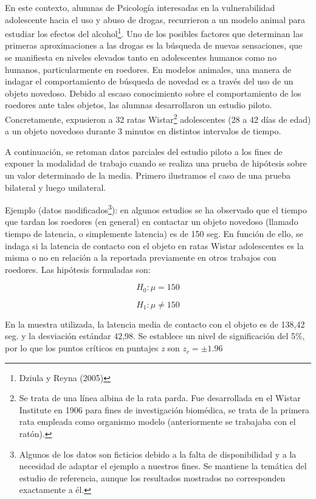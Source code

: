 \documentclass[]{book}
\let\rmarkdownfootnote\footnote%
\def\footnote{\protect\rmarkdownfootnote}
\begin{document}
En este contexto, alumnas de Psicología interesadas en la vulnerabilidad
adolescente hacia el uso y abuso de drogas, recurrieron a un modelo
animal para estudiar los efectos del alcohol\footnote{Dziula y Reyna (2005)}. Uno de los posibles
factores que determinan las primeras aproximaciones a las drogas es la
búsqueda de nuevas sensaciones, que se manifiesta en niveles elevados
tanto en adolescentes humanos como no humanos, particularmente en
roedores. En modelos animales, una manera de indagar el comportamiento
de búsqueda de novedad es a través del uso de un objeto novedoso. Debido
al escaso conocimiento sobre el comportamiento de los roedores ante
tales objetos, las alumnas desarrollaron un estudio piloto.
Concretamente, expusieron a 32 ratas Wistar\footnote{Se trata de una línea albina de la rata parda. Fue desarrollada en el Wistar Institute en 1906 para fines de investigación biomédica, se trata de la primera rata empleada como organismo modelo (anteriormente se trabajaba con el ratón).} adolescentes (28 a 42
días de edad) a un objeto novedoso durante 3 minutos en distintos
intervalos de tiempo.

A continuación, se retoman datos parciales del estudio piloto a los
fines de exponer la modalidad de trabajo cuando se realiza una prueba de
hipótesis sobre un valor determinado de la media. Primero ilustramos el
caso de una prueba bilateral y luego unilateral.

Ejemplo (datos modificados\footnote{Algunos de los datos son ficticios debido a la falta de disponibilidad y a la necesidad de adaptar el ejemplo a nuestros fines. Se mantiene la temática del estudio de referencia, aunque los resultados mostrados no corresponden exactamente a él.}): en algunos estudios se ha observado
que el tiempo que tardan los roedores (en general) en contactar un
objeto novedoso (llamado tiempo de latencia, o simplemente latencia) es
de 150 seg. En función de ello, se indaga si la latencia de contacto con
el objeto en ratas Wistar adolescentes es la misma o no en relación a la
reportada previamente en otros trabajos con roedores. Las hipótesis
formuladas son:

\[H_{0}:\mu = 150\]

\[H_{1}:\mu \neq 150\]

En la muestra utilizada, la latencia media de contacto con el objeto es
de 138,42 seg. y la desviación estándar 42,98. Se establece un nivel de
significación del 5\%, por lo que los puntos críticos en puntajes \emph{z} son \(z_{c}=\pm 1.96\)
\end{document}
